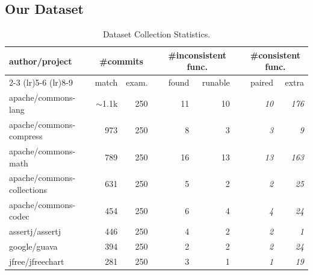 \documentclass[acmsmall, screen]{acmart}
\begin{document}
\subsection{Our Dataset}
\begin{table}[tb]
\centering
  \caption{Dataset Collection Statistics.}\label{tab:dataset}
\begin{tabular}{@{}lrrcrrc@{\hskip 4pt}rr@{}}
\toprule
\multirow{2}{*}{author/project}  & \multicolumn{2}{c}{\#commits} &           & \multicolumn{2}{c}{\#inconsistent func.} &           & \multicolumn{2}{c}{{\#consistent func.}} \\ \cmidrule(lr){2-3} \cmidrule(lr){5-6} \cmidrule(lr){8-9}
                                 & match      & exam.      &           & found              & runable             &           &  paired  &  extra              \\ \midrule
apache/commons-lang              & $\sim$1.1k    & 250           &           & 11                 & 10                  &           & \textit{10} & \textit{176}             \\
{apache/commons-compress}          & {973}           & {250}           &           & {8}                  & {3}                   &           & \textit{3} & \textit{9}                \\
apache/commons-math              & 789           & 250           &           & 16                 & 13                  &           & \textit{13} & \textit{163}             \\
apache/commons-collections       & 631           & 250           &           & 5                  & 2                   &           & \textit{2} & \textit{25}               \\
{apache/commons-codec}             & {454}           & {250}           &           & {6}                  & {4}                   &           & \textit{4} & \textit{24}               \\
assertj/assertj                  & 446           & 250           &           & 4                  & 2                   &           & \textit{2} & \textit{1}                \\
google/guava                     & 394           & 250           &           & 2                  & 2                   &           & \textit{2} & \textit{24}               \\
{jfree/jfreechart}                 & {281}           & {250}           &           & {3}                  & {1}                   &           & \textit{1} & \textit{19}               \\

\end{tabular}
\end{table}
\end{document}
